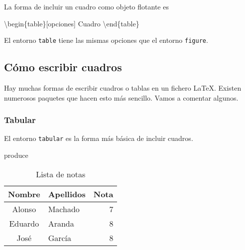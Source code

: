 \documentclass[11pt]{article}
\newenvironment{Shaded}{}{}
\newcommand{\NormalTok}[1]{{#1}}
\begin{document}
La forma de incluir un cuadro como objeto flotante es

\begin{Shaded}
\begin{Highlighting}[]
\NormalTok{\textbackslash{}begin\{table\}[opciones]}
\NormalTok{Cuadro}
\NormalTok{\textbackslash{}end\{table\}}
\end{Highlighting}
\end{Shaded}

El entorno \texttt{table} tiene las mismas opciones que el entorno
\texttt{figure}.

\subsection{Cómo escribir cuadros}\label{cuxf3mo-escribir-cuadros}

Hay muchas formas de escribir cuadros o tablas en un fichero LaTeX.
Existen numerosos paquetes que hacen esto más sencillo. Vamos a comentar
algunos.

\subsubsection{Tabular}\label{tabular}

El entorno \texttt{tabular} es la forma más básica de incluir cuadros.

\begin{Shaded}
\end{Shaded}
produce
\begin{table}[htp] %
\centering
\begin{tabular}{||c|l|r||}
\hline \hline Nombre & Apellidos & Nota \\
\hline Alonso & Machado & 7 \\
\hline Eduardo & Aranda & 8 \\
\hline José & García & 8 \\
\hline \hline
\end{tabular}
\caption{Lista de notas}
\end{table}
\end{document}
